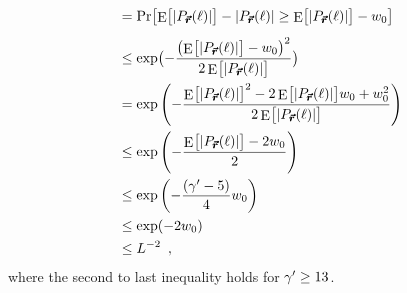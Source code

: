\documentclass{article}
\DeclareMathOperator{\Expop}{E}
\newcommand{\Prob}[2][]{\Pr_{#1} \bigl[ #2 \bigr]}
\newcommand{\Expectation}[2][]{\Expop_{#1} \bigl[ #2 \bigr]}
\newcommand{\setsize}[1]{\lvert#1\rvert}
\newcommand{\eqcomma}{\enspace ,}
\newcommand{\cgammap}{\ensuremath \gamma'}
\newcommand{\indexvec}{\ell}
\newcommand{\nvecs}{L}
\newcommand{\vecr}{\vec{r}}
\newcommand{\vecrb}{\pmb{\vecr}}
\newcommand{\goodset}[2][\vecrb]{P_{#1}(#2)}
\numberwithin{equation}{section}
\begin{document}
{\begin{enumerate}
\begin{subequations}
\begin{align}
  &=
  \Prob{ \Expectation{ \setsize{ \goodset{\indexvec} } } - \setsize{ \goodset{\indexvec} }
   \ge \Expectation{ \setsize{ \goodset{\indexvec} } } - w_0  }\\
  &\le
  \exp
  \bigl( - 
  \frac{\bigl(\Expectation{ \setsize{ \goodset{\indexvec} } } - w_0 \bigr)^2}{2 \Expectation{ \setsize{ \goodset{\indexvec} } } }
  \bigr)\\  
  &=
  \exp 
  \left( - 
  \frac{\Expectation{ \setsize{ \goodset{\indexvec} } }^2 - 2\Expectation{ \setsize{ \goodset{\indexvec} } } w_0 + w_0^2}{2 \Expectation{ \setsize{ \goodset{\indexvec} } } }
  \right)\\
  &\le
  \exp
  \left( - 
  \frac{\Expectation{ \setsize{ \goodset{\indexvec} } } - 2 w_0}{ 2 }
  \right)\\
  &\le
  \exp
  \left( - 
  \frac{ (\cgammap - 5)}{ 4 } w_0
  \right)\\
  &\le
  \exp( -2 w_0 )\\
  &\le
  \nvecs^{-2} \eqcomma
\end{align}
\end{subequations}
where the second to last inequality holds for $\cgammap\geq 13$. 


\end{enumerate}}
\end{document}
